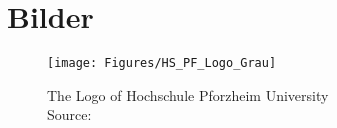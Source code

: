 
\chapter{Bilder} %

\label{AppendixB} %

\begin{figure}[h] %
    \centering %
    \texttt{[image: Figures/HS\_PF\_Logo\_Grau]}
    \caption[Logo HSPF]{The Logo of Hochschule Pforzheim University\\ Source: \cite{WissArbeiten}} %
    \label{fig:DellVC}
\end{figure}
